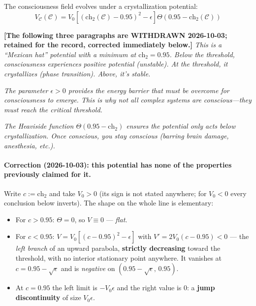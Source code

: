\begin{level3}
The consciousness field evolves under a crystallization potential:
\begin{equation}
V_\mathcal{C}(\mathcal{C}) = V_0 \left[ (\text{ch}_2(\mathcal{C}) - 0.95)^2 - \epsilon \right] \Theta(0.95 - \text{ch}_2(\mathcal{C}))
\end{equation}

\textbf{[The following three paragraphs are WITHDRAWN 2026-10-03; retained for
the record, corrected immediately below.]}
\emph{This is a ``Mexican hat'' potential\cite{higgs1964,weinberg1995} with a
minimum at $\text{ch}_2 = 0.95$. Below the threshold, consciousness experiences
positive potential (unstable). At the threshold, it crystallizes (phase
transition). Above, it's stable.}

\emph{The parameter $\epsilon > 0$ provides the energy barrier that must be
overcome for consciousness to emerge. This is why not all complex systems are
conscious---they must reach the critical threshold.}

\emph{The Heaviside function $\Theta(0.95 - \text{ch}_2)$ ensures the potential
only acts below crystallization. Once conscious, you stay conscious (barring
brain damage, anesthesia, etc.).}

\paragraph{Correction (2026-10-03): this potential has none of the properties previously claimed for it.}
Write $c := \text{ch}_2$ and take $V_0 > 0$ (its sign is not stated anywhere; for
$V_0 < 0$ every conclusion below inverts). The shape on the whole line is
elementary:

\begin{itemize}
\item For $c > 0.95$: $\Theta = 0$, so $V \equiv 0$ --- \emph{flat}.
\item For $c < 0.95$: $V = V_0[(c-0.95)^2 - \epsilon]$ with
  $V' = 2V_0(c-0.95) < 0$ --- the \emph{left branch} of an upward parabola,
  \textbf{strictly decreasing} toward the threshold, with no interior stationary
  point anywhere. It vanishes at $c = 0.95 - \sqrt\epsilon$ and is
  \emph{negative} on $(0.95-\sqrt\epsilon,\, 0.95)$.
\item At $c = 0.95$ the left limit is $-V_0\epsilon$ and the right value is $0$:
  a \textbf{jump discontinuity} of size $V_0\epsilon$.
\end{itemize}


\end{level3}
